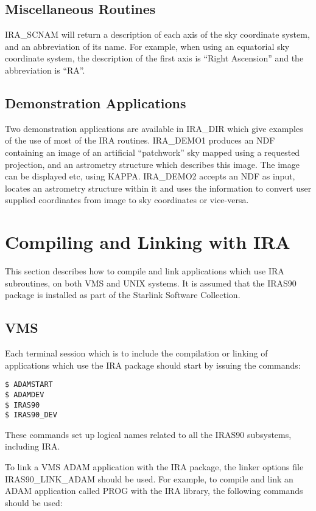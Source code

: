 \subsection {Miscellaneous Routines}
IRA\_SCNAM will return a description of each axis of the sky coordinate system,
and an abbreviation of its name. For example, when using an equatorial sky
coordinate system, the description of the first axis is ``Right Ascension'' and
the abbreviation is ``RA''.

\subsection {Demonstration Applications}
Two demonstration applications are available in IRA\_DIR which give examples of
the use of most of the IRA routines. IRA\_DEMO1 produces an NDF containing an
image of an artificial ``patchwork'' sky mapped using a requested projection,
and an astrometry structure which describes this image. The image can be
displayed etc, using KAPPA. IRA\_DEMO2 accepts an NDF as input, locates an
astrometry structure within it and uses the information to convert user supplied
coordinates from image to sky coordinates or vice-versa.

\section {Compiling and Linking with IRA}
\label{SEC:LINK}
This section describes how to compile and link applications which use IRA
subroutines, on both VMS and UNIX systems. It is assumed that the IRAS90 package
is installed as part of the Starlink Software Collection.

\subsection{VMS}
Each terminal session which is to include the compilation or linking of
applications which use the IRA package should start by issuing the commands:

\begin{verbatim}
$ ADAMSTART
$ ADAMDEV
$ IRAS90
$ IRAS90_DEV
\end{verbatim}

These commands set up logical names related to all the IRAS90
subsystems, including IRA.

To link a VMS ADAM application with the IRA package, the linker options file
IRAS90\_LINK\_ADAM should be used. For example, to compile and link an ADAM
application called PROG with the IRA library, the following commands should be
used:

